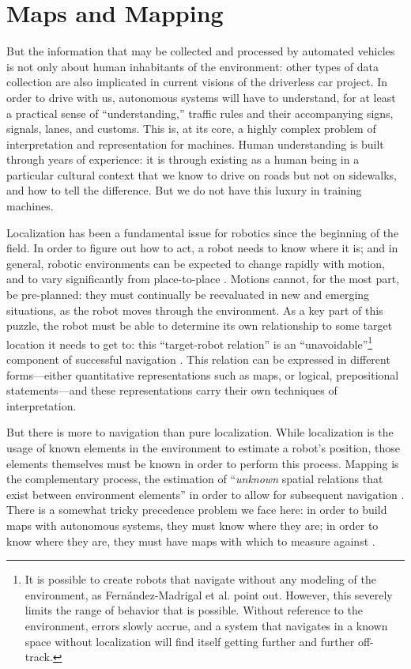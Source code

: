 

\section{Maps and Mapping}

But the information that may be collected and processed by automated
vehicles is not only about human inhabitants of the environment: other
types of data collection are also implicated in current
visions of the driverless car project. In order to drive with us,
autonomous systems will have to understand,
for at least a practical sense of ``understanding,'' traffic rules and
their accompanying signs, signals, lanes, and customs. This is, at its
core, a highly complex problem of interpretation and representation
for machines. Human understanding is built
through years of experience: it is through existing as a human being
in a particular cultural context that we know to drive on roads but
not on sidewalks, and how to tell the difference. But we do not have
this luxury in training machines. %

Localization has been a fundamental issue for robotics since the
beginning of the field. In order to figure out how to act, a robot
needs to know where it is; and in general, robotic environments can be
expected to change rapidly with motion, and to vary significantly from
place-to-place \cite[p. 4]{SLAMbook}. Motions cannot, for the most part,
be pre-planned:  they must continually be reevaluated in new and
emerging situations, as the robot moves through the environment. As a
key part of this puzzle, the robot must be able to determine its own
relationship to some target location it needs to get to: this
``target-robot relation'' is an ``unavoidable''\footnote{It is
  possible to create robots that navigate without any modeling of the
environment, as Fern\'{a}ndez-Madrigal et al. point out. However, this
severely limits the range of behavior that is possible. Without
reference to the environment, errors slowly accrue, and a system that
navigates in a known space without localization will find itself
getting further and further off-track.} component of successful
navigation \cite[p. 5]{SLAMbook}. This relation can be expressed
in different forms---either quantitative representations such as maps,
or logical, prepositional statements---and these representations carry
their own techniques of interpretation. 

But there is more to navigation than pure localization. While
localization is the usage of known elements in the environment to
estimate a robot's position, those elements themselves must be known
in order to perform this process. Mapping is the complementary
process, the estimation of ``\emph{unknown} spatial relations that
exist between environment elements'' in order to allow for subsequent
navigation \cite[p. 5]{SLAMbook}. There is a somewhat tricky
precedence problem we face here:  in order to build maps with
autonomous systems, they must know where they are; in order to know
where they are, they must have maps with which to measure
against \cite[p. 6]{SLAMbook}.

